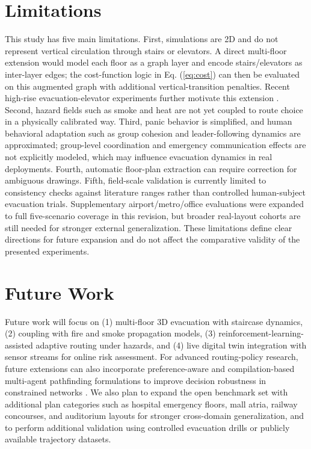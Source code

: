 \documentclass[utf8]{FrontiersinHarvard}
\begin{document}
\section{Limitations}
This study has five main limitations. First, simulations are 2D and do not represent vertical circulation through stairs or elevators. A direct multi-floor extension would model each floor as a graph layer and encode stairs/elevators as inter-layer edges; the cost-function logic in Eq. (\ref{eq:cost}) can then be evaluated on this augmented graph with additional vertical-transition penalties. Recent high-rise evacuation-elevator experiments further motivate this extension \cite{mossberg2020elevator}. Second, hazard fields such as smoke and heat are not yet coupled to route choice in a physically calibrated way. Third, panic behavior is simplified, and human behavioral adaptation such as group cohesion and leader-following dynamics are approximated; group-level coordination and emergency communication effects are not explicitly modeled, which may influence evacuation dynamics in real deployments. Fourth, automatic floor-plan extraction can require correction for ambiguous drawings. Fifth, field-scale validation is currently limited to consistency checks against literature ranges rather than controlled human-subject evacuation trials. Supplementary airport/metro/office evaluations were expanded to full five-scenario coverage in this revision, but broader real-layout cohorts are still needed for stronger external generalization. These limitations define clear directions for future expansion and do not affect the comparative validity of the presented experiments.

\section{Future Work}
Future work will focus on (1) multi-floor 3D evacuation with staircase dynamics, (2) coupling with fire and smoke propagation models, (3) reinforcement-learning-assisted adaptive routing under hazards, and (4) live digital twin integration with sensor streams for online risk assessment. For advanced routing-policy research, future extensions can also incorporate preference-aware and compilation-based multi-agent pathfinding formulations to improve decision robustness in constrained networks \cite{ho2022mapfpref,surynek2022mapfsurvey}. We also plan to expand the open benchmark set with additional plan categories such as hospital emergency floors, mall atria, railway concourses, and auditorium layouts for stronger cross-domain generalization, and to perform additional validation using controlled evacuation drills or publicly available trajectory datasets.
\end{document}
